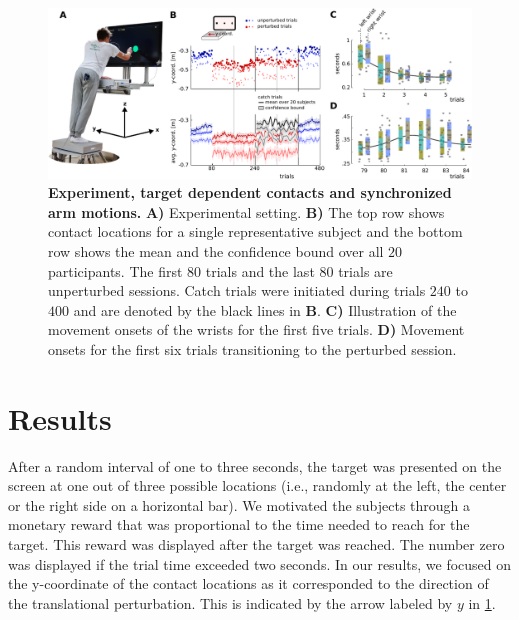 \begin{figure}[t]
\centering
\includegraphics[width=\textwidth]{Elmar/picsClean/Fig1ExperimentContactsOnsets}
 \caption{\textbf{Experiment, target dependent contacts and synchronized arm motions.} \textbf{A)} Experimental setting. 
 \textbf{B)}  The top row shows contact locations for a single representative subject 
 and the bottom row shows the mean and the confidence bound over all $20$ participants. 
 The first $80$ trials and the last $80$ trials are unperturbed sessions. 
 Catch trials were initiated during trials $240$ to $400$ and are denoted by the black lines in \textbf{B}.
%  
 \textbf{C)} Illustration of the movement onsets of the wrists for the first five trials. 
 \textbf{D)} Movement onsets for the first six trials transitioning to the perturbed session. 
}
\label{fig:subFigContactLocationsAllSubjects}
\end{figure}


\section{Results}%

After a random interval of one to 
three seconds, the target was presented on the screen at one out of three possible locations (i.e., randomly at the left, the center or the right side on a horizontal bar). We motivated the subjects 
through a monetary reward that was proportional to the time needed to reach for 
the target. This reward was displayed after the target was reached. The number zero was displayed if the trial time exceeded two seconds. 
In our results, we focused on the y-coordinate of the contact locations 
as it corresponded to the direction of the translational 
perturbation. This is indicated by the arrow labeled by $y$ in \FigureAbbrP \ref{fig:subFigContactLocationsAllSubjects}. 

